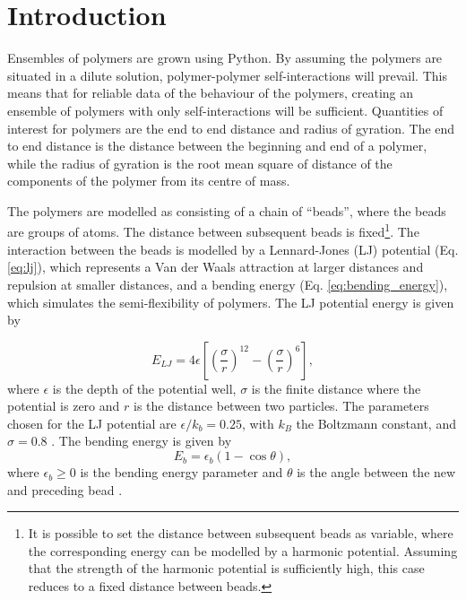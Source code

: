 \section{Introduction}
Ensembles of polymers are grown using Python. By assuming the polymers are situated in a dilute solution, polymer-polymer self-interactions will prevail. This means that for reliable data of the behaviour of the polymers, creating an ensemble of polymers with only self-interactions will be sufficient. Quantities of interest for polymers are the end to end distance and radius of gyration. The end to end distance is the distance between the beginning and end of a polymer, while the radius of gyration is the root mean square of distance of the components of the polymer from its centre of mass.

The polymers are modelled as consisting of a chain of ``beads'', where the beads are groups of atoms. The distance between subsequent beads is fixed\footnote{It is possible to set the distance between subsequent beads as variable, where the corresponding energy can be modelled by a harmonic potential. Assuming that the strength of the harmonic potential is sufficiently high, this case reduces to a fixed distance between beads.}. The interaction between the beads is modelled by a Lennard-Jones (LJ) potential (Eq. \ref{eq:lj}), which represents a Van der Waals attraction at larger distances and repulsion at smaller distances, and a bending energy (Eq. \ref{eq:bending_energy}), which simulates the semi-flexibility of polymers. The LJ potential energy is given by 

\begin{equation}\label{eq:lj}
   E_{LJ} = 4\epsilon \left[ \left(\frac{\sigma}{r}\right)^{12} - \left(\frac{\sigma}{r}\right)^{6} \right],
\end{equation} where $\epsilon$ is the depth of the potential well, $\sigma$ is the finite distance where the potential is zero and $r$ is the distance between two particles. The parameters chosen for the LJ potential are $\epsilon/k_b=0.25$, with $k_B$ the Boltzmann constant, and $\sigma=0.8$ \cite{jmt}. The bending energy is given by
\begin{equation}\label{eq:bending_energy}
    E_{b} = \epsilon_b(1-\cos{\theta}),
\end{equation} where $\epsilon_b\geq 0$ is the bending energy parameter and $\theta$ is the angle between the new and preceding bead \cite{hsu2011review}.

